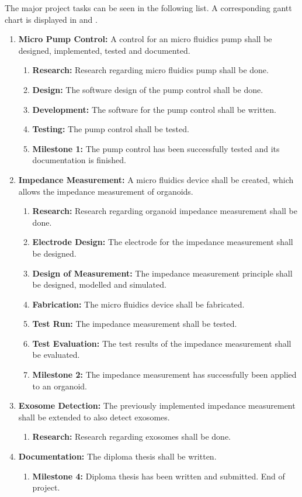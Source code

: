 The major project tasks can be seen in the following list. A corresponding gantt chart is displayed in  and . 
\begin{enumerate}
\item \textbf{Micro Pump Control:} A control for an micro fluidics pump shall be designed, implemented, tested and documented.
    \begin{enumerate}
        \item \textbf{Research:} Research regarding micro fluidics pump shall be done. 
        \item \textbf{Design:} The software design of the pump control shall be done.
        \item \textbf{Development:} The software for the pump control shall be written.
        \item \textbf{Testing:} The pump control shall be tested.
        \item \textbf{Milestone 1:} The pump control has been successfully tested and its documentation is finished.
    \end{enumerate}
\item \textbf{Impedance Measurement:} A micro fluidics device shall be created, which allows the impedance measurement of organoids.
    \begin{enumerate}
        \item \textbf{Research:} Research regarding organoid impedance measurement shall be done. 
        \item \textbf{Electrode Design:} The electrode for the impedance measurement shall be designed.
        \item \textbf{Design of Measurement:} The impedance measurement principle shall be designed, modelled and simulated.
        \item \textbf{Fabrication:} The micro fluidics device shall be fabricated.
        \item \textbf{Test Run:} The impedance measurement shall be tested.
        \item \textbf{Test Evaluation:} The test results of the impedance measurement shall be evaluated.
        \item \textbf{Milestone 2:} The impedance measurement has successfully been applied to an organoid.
    \end{enumerate}
\item \textbf{Exosome Detection:} The previously implemented impedance measurement shall be extended to also detect exosomes.
    \begin{enumerate}
        \item \textbf{Research:} Research regarding exosomes shall be done.
    \end{enumerate}
\item \textbf{Documentation:} The diploma thesis shall be written.
    \begin{enumerate}
        \item \textbf{Milestone 4:} Diploma thesis has been written and submitted. End of project.
    \end{enumerate}
\end{enumerate}
 
